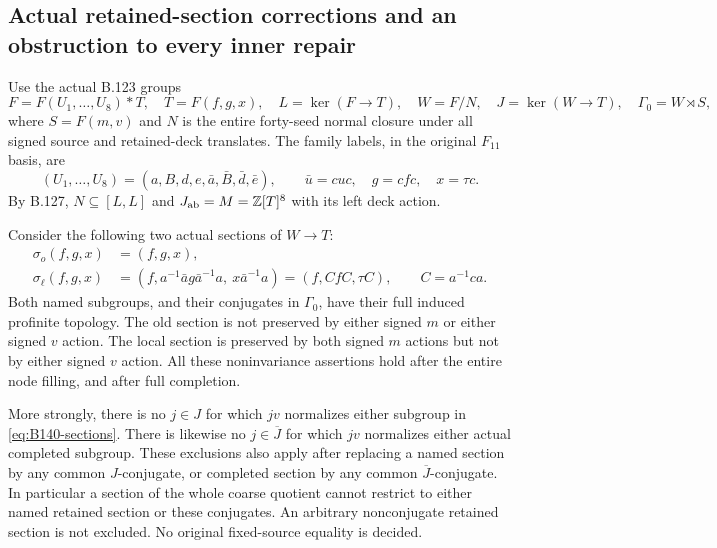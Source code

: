 \subsection*{Actual retained-section corrections and an obstruction to every inner repair}

\label{stmt:B140}
Use the actual B.123 groups
\[
 F=F(U_1,\ldots,U_8)*T,\quad T=F(f,g,x),\quad
 L=\ker(F\to T),\quad W=F/N,\quad
 J=\ker(W\to T),\quad \Gamma_0=W\rtimes S,
\]
where $S=F(m,v)$ and $N$ is the entire forty-seed normal closure
under all signed source and retained-deck translates.
The family labels, in the original $F_{11}$ basis, are
\[
 (U_1,\ldots,U_8)=(a,B,d,e,\bar a,\bar B,\bar d,\bar e),
 \qquad \bar u=cuc,\quad g=cfc,\quad x=\tau c.
\]
By B.127, $N\subseteq[L,L]$ and
$J_{\rm ab}=M=\mathbb Z[T]^8$ with its left deck action.

Consider the following two actual sections of $W\to T$:
\begin{equation}\label{eq:B140-sections}
 \begin{aligned}
 \sigma_o(f,g,x)&=(f,g,x),\\
 \sigma_\ell(f,g,x)
   &=(f,a^{-1}\bar a g\bar a^{-1}a,\ x\bar a^{-1}a)
     =(f,CfC,\tau C),\qquad C=a^{-1}ca .
 \end{aligned}
\end{equation}
Both named subgroups, and their conjugates in $\Gamma_0$,
have their full induced profinite topology.
The old section is not preserved by either signed $m$ or
either signed $v$ action. The local section is preserved
by both signed $m$ actions but not by either signed $v$ action.
All these noninvariance assertions hold after the entire
node filling, and after full completion.

More strongly, there is no $j\in J$ for which $jv$
normalizes either subgroup in \eqref{eq:B140-sections}.
There is likewise no $j\in\overline J$ for which $jv$
normalizes either actual completed subgroup.
These exclusions also apply after replacing a named section
by any common $J$-conjugate, or completed section by any
common $\overline J$-conjugate.
In particular a section of the whole coarse quotient cannot
restrict to either named retained section or these conjugates.
An arbitrary nonconjugate retained section is not excluded.
No original fixed-source equality is decided.

